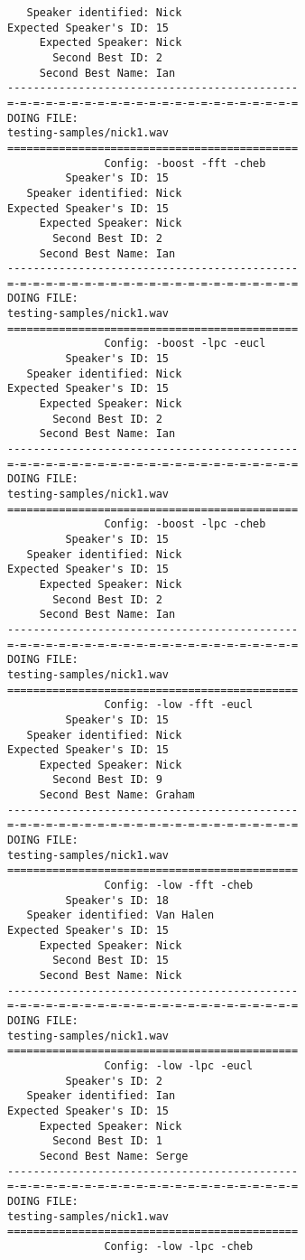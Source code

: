 \begin{verbatim}
   Speaker identified: Nick
Expected Speaker's ID: 15
     Expected Speaker: Nick
       Second Best ID: 2
     Second Best Name: Ian
---------------------------------------------
=-=-=-=-=-=-=-=-=-=-=-=-=-=-=-=-=-=-=-=-=-=-=
DOING FILE:
testing-samples/nick1.wav
=============================================
               Config: -boost -fft -cheb
         Speaker's ID: 15
   Speaker identified: Nick
Expected Speaker's ID: 15
     Expected Speaker: Nick
       Second Best ID: 2
     Second Best Name: Ian
---------------------------------------------
=-=-=-=-=-=-=-=-=-=-=-=-=-=-=-=-=-=-=-=-=-=-=
DOING FILE:
testing-samples/nick1.wav
=============================================
               Config: -boost -lpc -eucl
         Speaker's ID: 15
   Speaker identified: Nick
Expected Speaker's ID: 15
     Expected Speaker: Nick
       Second Best ID: 2
     Second Best Name: Ian
---------------------------------------------
=-=-=-=-=-=-=-=-=-=-=-=-=-=-=-=-=-=-=-=-=-=-=
DOING FILE:
testing-samples/nick1.wav
=============================================
               Config: -boost -lpc -cheb
         Speaker's ID: 15
   Speaker identified: Nick
Expected Speaker's ID: 15
     Expected Speaker: Nick
       Second Best ID: 2
     Second Best Name: Ian
---------------------------------------------
=-=-=-=-=-=-=-=-=-=-=-=-=-=-=-=-=-=-=-=-=-=-=
DOING FILE:
testing-samples/nick1.wav
=============================================
               Config: -low -fft -eucl
         Speaker's ID: 15
   Speaker identified: Nick
Expected Speaker's ID: 15
     Expected Speaker: Nick
       Second Best ID: 9
     Second Best Name: Graham
---------------------------------------------
=-=-=-=-=-=-=-=-=-=-=-=-=-=-=-=-=-=-=-=-=-=-=
DOING FILE:
testing-samples/nick1.wav
=============================================
               Config: -low -fft -cheb
         Speaker's ID: 18
   Speaker identified: Van Halen
Expected Speaker's ID: 15
     Expected Speaker: Nick
       Second Best ID: 15
     Second Best Name: Nick
---------------------------------------------
=-=-=-=-=-=-=-=-=-=-=-=-=-=-=-=-=-=-=-=-=-=-=
DOING FILE:
testing-samples/nick1.wav
=============================================
               Config: -low -lpc -eucl
         Speaker's ID: 2
   Speaker identified: Ian
Expected Speaker's ID: 15
     Expected Speaker: Nick
       Second Best ID: 1
     Second Best Name: Serge
---------------------------------------------
=-=-=-=-=-=-=-=-=-=-=-=-=-=-=-=-=-=-=-=-=-=-=
DOING FILE:
testing-samples/nick1.wav
=============================================
               Config: -low -lpc -cheb

\end{verbatim}
